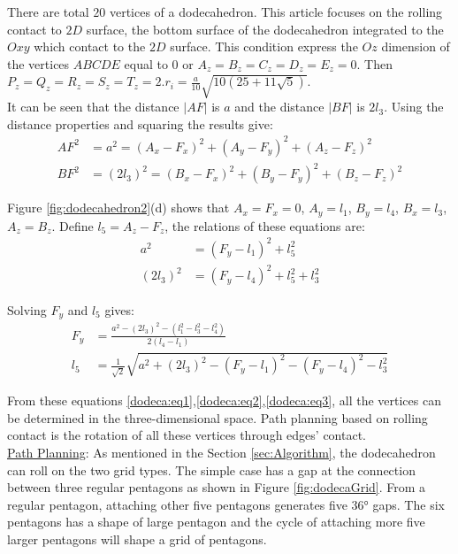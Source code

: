 \noindent There are total $20$ vertices of a dodecahedron. 
This article focuses on the rolling contact to $2D$ surface, the bottom surface of the dodecahedron integrated to the $Oxy$ which contact to the $2D$ surface. 
This condition express the $Oz$ dimension of the vertices $ABCDE$ equal to $0$ or $A_z = B_z = C_z = D_z = E_z = 0$. 
Then $P_z = Q_z = R_z = S_z = T_z = 2.r_i = \frac{a}{10}\sqrt{10(25+11\sqrt{5})}$.\\

\noindent It can be seen that the distance $|AF|$ is $a$ and the distance $|BF|$ is $2l_3$. Using the distance properties and squaring the results give:
\begin{equation} 
\label{dodeca:eq1}
\begin{split}
AF^2 & = a^2 = (A_x-F_x)^2 + (A_y-F_y)^2 + (A_z-F_z)^2 \\
BF^2 & = (2l_3)^2 = (B_x-F_x)^2 + (B_y-F_y)^2 + (B_z-F_z)^2
\end{split}
\end{equation}

\noindent Figure \ref{fig:dodecahedron2}(d) shows that $A_x = F_x = 0$, $A_y = l_1$, $B_y = l_4$, $B_x = l_3$, $A_z = B_z$. Define $l_5=A_z-F_z$, the relations of these equations are:
\begin{equation} 
\label{dodeca:eq2}
\begin{split}
a^2 & = (F_y-l_1)^2 + l_5^2\\
(2l_3)^2 & = (F_y-l_4)^2 + l_5^2 + l_3^2
\end{split}
\end{equation}

Solving $F_y$ and $l_5$ gives:
\begin{equation} 
\label{dodeca:eq3}
\begin{split}
F_y & = \frac{a^2-(2l_3)^2-(l_1^2-l_3^2-l_4^2)}{2(l_4-l_1)} \\
l_5 & = \frac{1}{\sqrt{2}}\sqrt{a^2+(2l_3)^2-(F_y-l_1)^2-(F_y-l_4)^2-l_3^2}
\end{split}
\end{equation}

\noindent From these equations \ref{dodeca:eq1},\ref{dodeca:eq2},\ref{dodeca:eq3}, all the vertices can be determined in the three-dimensional space. 
Path planning based on rolling contact is the rotation of all these vertices through edges' contact.\\

\noindent\uline{Path Planning}: As mentioned in the Section \ref{sec:Algorithm}, the dodecahedron can roll on the two grid types. The simple case has a gap at the connection between three regular pentagons as shown in Figure \ref{fig:dodecaGrid}. From a regular pentagon, attaching other five pentagons generates five $\ang{36}$ gaps. The six pentagons has a shape of large pentagon and the cycle of attaching more five larger pentagons will shape a grid of pentagons.

